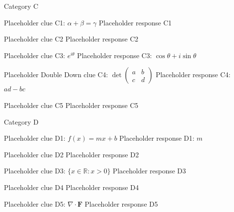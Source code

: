 \documentclass{article}
\begin{document}
\begin{category}{Category C}
  \begin{clue}
    Placeholder clue C1: $\alpha + \beta = \gamma$
  \response
    Placeholder response C1
  \end{clue}
  \begin{clue}
    Placeholder clue C2
  \response
    Placeholder response C2
  \end{clue}
  \begin{clue}
    Placeholder clue C3: $e^{i\theta}$
  \response
    Placeholder response C3: $\cos\theta + i\sin\theta$
  \end{clue}
  \begin{clue}[doubledown]
    Placeholder Double Down clue C4: $\det\begin{pmatrix} a & b \\ c & d \end{pmatrix}$
  \response
    Placeholder response C4: $ad - bc$
  \end{clue}
  \begin{clue}
    Placeholder clue C5
  \response
    Placeholder response C5
  \end{clue}
\end{category}

\begin{category}{Category D}
  \begin{clue}
    Placeholder clue D1: $f(x) = mx + b$
  \response
    Placeholder response D1: $m$
  \end{clue}
  \begin{clue}
    Placeholder clue D2
  \response
    Placeholder response D2
  \end{clue}
  \begin{clue}
    Placeholder clue D3: $\{x \in \mathbb{R} : x > 0\}$
  \response
    Placeholder response D3
  \end{clue}
  \begin{clue}
    Placeholder clue D4
  \response
    Placeholder response D4
  \end{clue}
  \begin{clue}
    Placeholder clue D5: $\nabla \cdot \mathbf{F}$
  \response
    Placeholder response D5
  \end{clue}
\end{category}
\end{document}
